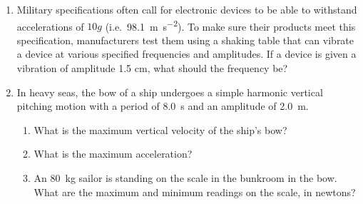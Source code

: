 \begin{enumerate}
%  

\item Military specifications often call for electronic devices to be able to
  withstand accelerations of $10g$ (i.e.\
  \SI{98.1}{\metre\per\second\squared}). To make sure their products meet this
  specification, manufacturers test them using a shaking table that can vibrate
  a device at various specified frequencies and amplitudes. If a device is
  given a vibration of amplitude 1.5 cm, what should the frequency be?

\item In heavy seas, the bow of a ship undergoes a simple harmonic vertical
  pitching motion with a period of \SI{8.0}{\second} and an amplitude of
  \SI{2.0}\metre.
  \begin{enumerate}[itemsep=3pt]
  \item What is the maximum vertical velocity of the ship's bow?
  \item What is the maximum acceleration?
  \item An \SI{80}{\kilo\gram} sailor is standing on the scale in the bunkroom
    in the bow. What are the maximum and minimum readings on the scale, in
    newtons?
  \end{enumerate}


\end{enumerate}
